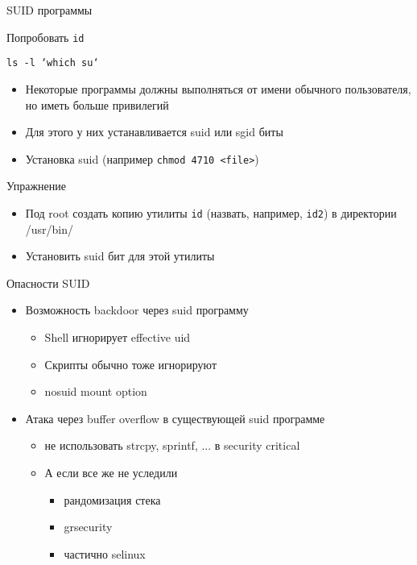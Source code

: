 \begin{frame}{SUID программы}
	\begin{block}{Попробовать}
		{\tt id}

		{\tt ls -l `which su`}
	\end{block}
	\pause
	\begin{itemize}
		\item Некоторые программы должны выполняться от имени обычного пользователя, но иметь больше привилегий
		\item Для этого у них устанавливается suid или sgid биты
		\item Установка suid (например {\tt chmod 4710 <file>})
	\end{itemize}
	\pause
	\begin{block}{Упражнение}
		\begin{itemize}
			\item Под root создать копию утилиты {\tt id} (назвать, например, {\tt id2}) в директории /usr/bin/
			\item Установить suid бит для этой утилиты
		\end{itemize}
	\end{block}
\end{frame}

\begin{frame}{Опасности SUID}
	\begin{itemize}
		\item Возможность backdoor через suid программу
			\begin{itemize}
				\item Shell игнорирует effective uid
				\item Скрипты обычно тоже игнорируют
				\item nosuid mount option
			\end{itemize}
		\item Атака через buffer overflow в существующей suid программе
			\begin{itemize}
				\item не использовать strcpy, sprintf, ... в security critical
				\item А если все же не уследили
					\begin{itemize}
						\item рандомизация стека
						\item grsecurity
						\item частично selinux
					\end{itemize}
			\end{itemize}
	\end{itemize}
\end{frame}


